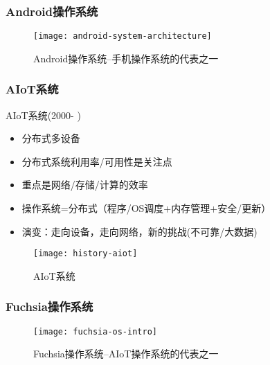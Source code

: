 \begin{frame}[plain]
    \frametitle{Android操作系统}
    
    \begin{figure}
        \centering
        \texttt{[image: android-system-architecture]}
        \caption{Android操作系统--手机操作系统的代表之一}
    \end{figure}
    
\end{frame}

\begin{frame}[plain]
	
	\frametitle{AIoT系统}
	
	AIoT系统(2000- )

	\begin{itemize}
		\item 分布式多设备
		\item 分布式系统利用率/可用性是关注点	
		\item 重点是网络/存储/计算的效率
		\item 操作系统=分布式（程序/OS调度+内存管理+安全/更新）
		\item 演变：走向设备，走向网络，新的挑战(不可靠/大数据)
	\end{itemize}
	
	\begin{figure}
		\centering
		\texttt{[image: history-aiot]}
		\caption{AIoT系统}
	\end{figure}
	
\end{frame}

\begin{frame}[plain]
    \frametitle{Fuchsia操作系统}
    
    \begin{figure}
        \centering
        \texttt{[image: fuchsia-os-intro]}
        \caption{Fuchsia操作系统--AIoT操作系统的代表之一}
    \end{figure}
    
\end{frame}



